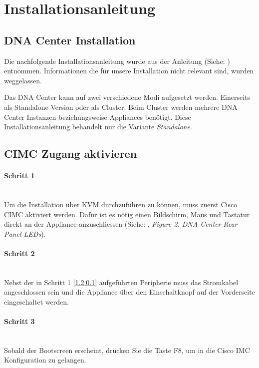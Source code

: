 \section{Installationsanleitung}

\subsection{DNA Center Installation}
Die nachfolgende Installationsanleitung wurde aus der Anleitung (Siehe: \cite{cisco-dna-installation-guide-1-2-chapter-configure}) entnommen. Informationen die für unsere Installation nicht relevant sind, wurden weggelassen. 

Das DNA Center kann auf zwei verschiedene Modi aufgesetzt werden. Einerseits als Standalone Version oder als Cluster. Beim Cluster werden mehrere DNA Center Instanzen beziehungsweise Appliances benötigt. Diese Installationsanleitung behandelt nur die Variante \textit{Standalone}.

\subsection{CIMC Zugang aktivieren}
\paragraph{Schritt 1}
\label{installguide-cimc-step1}
~\\
Um die Installation über KVM durchzuführen zu können, muss zuerst Cisco CIMC aktiviert werden. Dafür ist es nötig einen Bildschirm, Maus und Tastatur direkt an der Appliance anzuschliessen (Siehe: \cite{cisco-dna-installation-guide-1-2-chapter-install}, \textit{Figure 2. DNA Center Rear Panel LEDs}).

\paragraph{Schritt 2}
~\\
Nebst der in Schritt 1 [\ref{installguide-cimc-step1}] aufgeführten Peripherie muss das Stromkabel angeschlossen sein und die Appliance über den Einschaltknopf auf der Vorderseite eingeschaltet werden.

\paragraph{Schritt 3}
~\\
Sobald der Bootscreen erscheint, drücken Sie die Taste F8, um in die Cisco IMC Konfiguration zu gelangen. 



